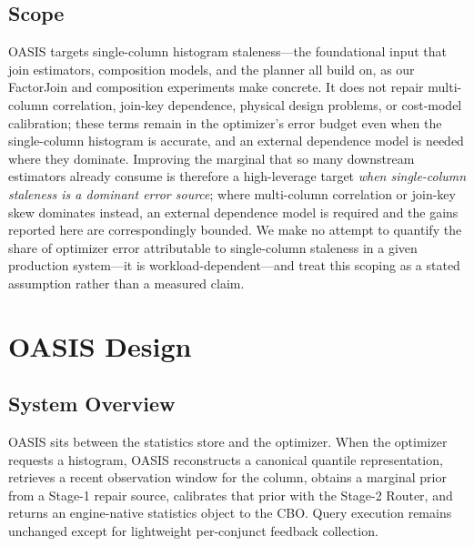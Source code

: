\documentclass[preprint,12pt]{elsarticle}
\begin{document}
\subsection{Scope}

OASIS targets single-column histogram staleness---the foundational input that
join estimators, composition models, and the planner all build on, as our
FactorJoin and composition experiments make concrete. It does not repair
multi-column correlation, join-key dependence, physical design problems, or
cost-model calibration; these terms remain in the optimizer's error budget even
when the single-column histogram is accurate, and an external dependence model is
needed where they dominate. Improving the marginal that so many downstream
estimators already consume is therefore a high-leverage target \emph{when
single-column staleness is a dominant error source}; where multi-column
correlation or join-key skew dominates instead, an external dependence model is
required and the gains reported here are correspondingly bounded. We make no
attempt to quantify the share of optimizer error attributable to single-column
staleness in a given production system---it is workload-dependent---and treat
this scoping as a stated assumption rather than a measured claim.

\section{OASIS Design}
\label{sec:design}

\subsection{System Overview}

OASIS sits between the statistics store and the optimizer. When the optimizer
requests a histogram, OASIS reconstructs a canonical quantile representation,
retrieves a recent observation window for the column, obtains a marginal prior
from a Stage-1 repair source, calibrates that prior with the Stage-2 Router, and
returns an engine-native statistics object to the CBO. Query execution remains
unchanged except for lightweight per-conjunct feedback collection.
\end{document}
